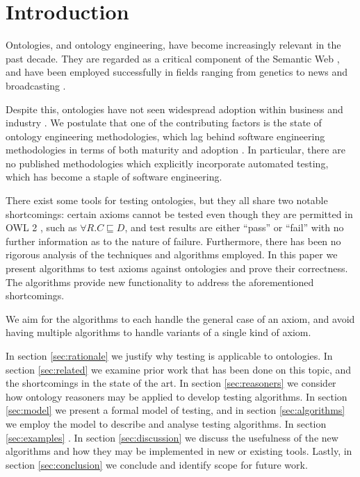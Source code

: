 \documentclass[paper.tex]{subfiles}
\begin{document}
\section{Introduction}
\label{sec:intro}

Ontologies, and ontology engineering, have become increasingly relevant in the past decade.
They are regarded as a critical component of the Semantic Web \cite{BernersLee:SemanticWeb}, and have been employed successfully in fields ranging from genetics \cite{GeneOntology:GoingForward} to news and broadcasting \cite{BBC:LinkedData}.

Despite this, ontologies have not seen widespread adoption within business and industry \cite{Cardoso:SemanticWebVision, Kaczmarek:EnterpriseModelling}.
We postulate that one of the contributing factors is the state of ontology engineering methodologies, which lag behind software engineering methodologies in terms of both maturity and adoption \cite{Iqbal:Methodologies, Simperl:Maturity}.
In particular, there are no published methodologies which explicitly incorporate automated testing, which has become a staple of software engineering.

There exist some tools for testing ontologies, but they all share two notable shortcomings: certain axioms cannot be tested even though they are permitted in OWL 2 \cite{W3C:OWL2Syntax}, such as $\forall R.C \sqsubseteq D$, and test results are either ``pass'' or ``fail'' with no further information as to the nature of failure.
Furthermore, there has been no rigorous analysis of the techniques and algorithms employed.
In this paper we present algorithms to test axioms against ontologies and prove their correctness.  \todo[performance?]
The algorithms provide new functionality to address the aforementioned shortcomings.

We aim for the algorithms to each handle the general case of an axiom, and avoid having multiple algorithms to handle variants of a single kind of axiom.

In section \ref{sec:rationale} we justify why testing is applicable to ontologies.
In section \ref{sec:related} we examine prior work that has been done on this topic, and the shortcomings in the state of the art.
In section \ref{sec:reasoners} we consider how ontology reasoners may be applied to develop testing algorithms.
In section \ref{sec:model} we present a formal model of testing, and in section \ref{sec:algorithms} we employ the model to describe and analyse testing algorithms.
In section \ref{sec:examples} \todo.
In section \ref{sec:discussion} we discuss the usefulness of the new algorithms and how they may be implemented in new or existing tools.
Lastly, in section \ref{sec:conclusion} we conclude and identify scope for future work.
\end{document}
